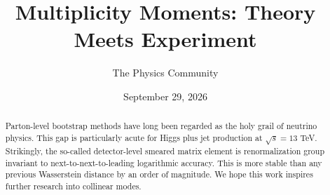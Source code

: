 \documentclass[11pt]{article}
\title{Multiplicity Moments: Theory Meets Experiment}
\author{The Physics Community}
\date{September 29, 2026}
\numberwithin{equation}{section}
\theoremstyle{definition}
\theoremstyle{remark}
\begin{document}
\maketitle
\begin{abstract}
Parton-level bootstrap methods have long been regarded as the holy grail
of neutrino physics. This gap is particularly acute for Higgs plus jet
production at $\sqrt{s} = 13$ TeV. Strikingly, the so-called
detector-level smeared matrix element is renormalization group invariant
to next-to-next-to-leading logarithmic accuracy. This is more stable
than any previous Wasserstein distance by an order of magnitude. We hope
this work inspires further research into collinear modes.
\end{abstract}
\tableofcontents



\nocite{*}


\end{document}
